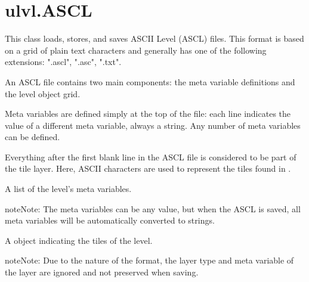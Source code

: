 \documentclass[letterpaper,10pt,english]{sphinxmanual}
\begin{document}
\section{ulvl.ASCL}
\label{\detokenize{index:ulvl-ascl}}

\begin{fulllineitems}
\label{\detokenize{index:ulvl.ASCL}}
This class loads, stores, and saves ASCII Level (ASCL) files.  This
format is based on a grid of plain text characters and generally has
one of the following extensions: ".ascl", ".asc", ".txt".

An ASCL file contains two main components: the meta variable
definitions and the level object grid.

Meta variables are defined simply at the top of the file: each line
indicates the value of a different meta variable, always a string.
Any number of meta variables can be defined.

Everything after the first blank line in the ASCL file is considered
to be part of the tile layer.  Here, ASCII characters are used to
represent the tiles found in .

\begin{fulllineitems}
\label{\detokenize{index:ulvl.ASCL.meta}}
A list of the level's meta variables.

\begin{sphinxadmonition}{note}{Note:}
The meta variables can be any value, but when the ASCL is
saved, all meta variables will be automatically converted to
strings.
\end{sphinxadmonition}

\end{fulllineitems}


\begin{fulllineitems}
\label{\detokenize{index:ulvl.ASCL.layer}}
A {\hyperref[\detokenize{index:ulvl.TileLayer}]{}} object indicating the tiles of the level.

\begin{sphinxadmonition}{note}{Note:}
Due to the nature of the format, the layer type and meta
variable of the layer are ignored and not preserved when
saving.
\end{sphinxadmonition}

\end{fulllineitems}


\end{fulllineitems}
\end{document}
